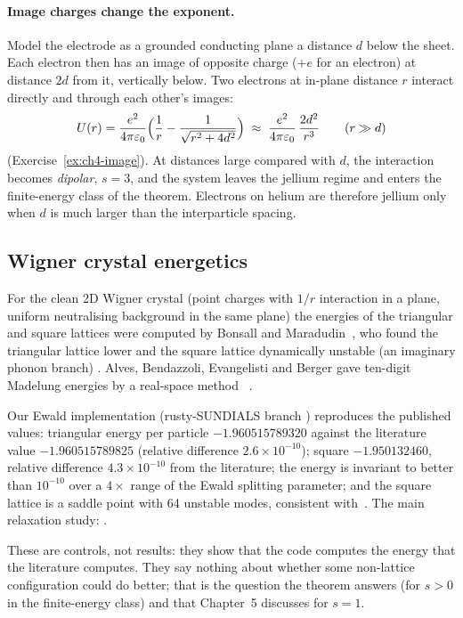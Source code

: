\paragraph{Image charges change the exponent.} Model the electrode as a grounded conducting plane a distance $d$ below
the sheet. Each electron then has an image of opposite charge ($+e$ for an electron) at distance $2d$ from it, vertically below. Two electrons
at in-plane distance $r$ interact directly and through each other's images:
\[
U(r) = \frac{e^2}{4\pi\varepsilon_0}\Bigl(\frac1r - \frac{1}{\sqrt{r^2+4d^2}}\Bigr)
\;\approx\;\frac{e^2}{4\pi\varepsilon_0}\,\frac{2d^2}{r^3}\qquad (r\gg d)
\]
\tierC{} (Exercise~\ref{ex:ch4-image}). At distances large compared with $d$, the interaction becomes
\emph{dipolar}, $s=3$, and the system leaves the jellium regime and enters the finite-energy class of the theorem.
Electrons on helium are therefore jellium only when $d$ is much larger than the interparticle spacing.

\subsection{Wigner crystal energetics}
For the clean 2D Wigner crystal (point charges with $1/r$ interaction in a plane, uniform neutralising background
in the same plane) the energies of the triangular and square lattices were computed by Bonsall and
Maradudin~\cite{bm}, who found the triangular lattice lower and the square lattice dynamically unstable (an
imaginary phonon branch) \tierL. Alves, Bendazzoli, Evangelisti and Berger gave ten-digit Madelung energies by a
real-space method~\cite{alves} \tierL.

\begin{numbox}
Our Ewald implementation (rusty-SUNDIALS branch ) reproduces the published
values: triangular energy per particle $-1.960515789320$ against the literature value $-1.960515789825$ (relative
difference $2.6\times10^{-10}$); square $-1.950132460$, relative difference $4.3\times10^{-10}$ from the
literature; the energy is invariant to better than $10^{-10}$ over a $4\times$ range of the Ewald splitting
parameter; and the square lattice is a saddle point with 64 unstable modes, consistent with~\cite{bm}. The main
relaxation study: \JelliumMainStatus.
\end{numbox}

These are controls, not results: they show that the code computes the energy that the literature computes. They
say nothing about whether some non-lattice configuration could do better; that is the question the theorem
answers (for $s>0$ in the finite-energy class) and that Chapter~5 discusses for $s=1$.

